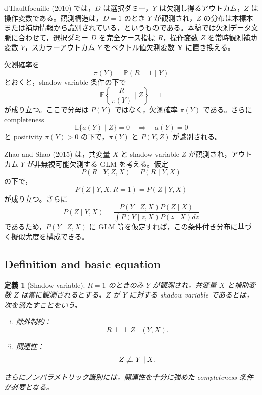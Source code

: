 \documentclass[10pt,a4paper]{article}
\newtheorem{definition}{定義}
\newcommand{\indep}{\mathrel{\perp\!\!\!\perp}}
\newcommand{\E}{\mathbb{E}}
\newcommand{\Prb}{\mathbb{P}}
\newcommand{\1}{\mathbf{1}}
\newcommand{\Y}{\bm{Y}}
\begin{document}
d'Haultfoeuille (2010) では，$D$ は選択ダミー，$Y$ は欠測し得るアウトカム，$Z$ は操作変数である。観測構造は，$D=1$ のとき $Y$ が観測され，$Z$ の分布は本標本または補助情報から識別されている，というものである。本稿では欠測データ文脈に合わせて，選択ダミー $D$ を完全ケース指標 $R$，操作変数 $Z$ を常時観測補助変数 $V$，スカラーアウトカム $Y$ をベクトル値欠測変数 $\Y$ に置き換える。

欠測確率を
\begin{equation}
  \pi(Y)=\Prb(R=1\mid Y)
\end{equation}
とおくと，shadow variable 条件の下で
\begin{equation}
  \E\left\{\frac{R}{\pi(Y)}\mid Z\right\}=1
  \label{eq:dh-correct-moment}
\end{equation}
が成り立つ。ここで分母は $P(Y)$ ではなく，欠測確率 $\pi(Y)$ である。さらに completeness
\begin{equation}
  \E\{a(Y)\mid Z\}=0 \quad\Rightarrow\quad a(Y)=0
  \label{eq:dh-completeness}
\end{equation}
と positivity $\pi(Y)>0$ の下で，$\pi(Y)$ と $P(Y,Z)$ が識別される。

Zhao and Shao (2015) は，共変量 $X$ と shadow variable $Z$ が観測され，アウトカム $Y$ が非無視可能欠測する GLM を考える。仮定
\begin{equation}
  P(R\mid Y,Z,X)=P(R\mid Y,X)
\end{equation}
の下で，
\begin{equation}
P(Z\mid Y,X,R=1)=P(Z\mid Y,X)
\end{equation}
が成り立つ。さらに
\begin{equation}
P(Z\mid Y,X)=
\frac{P(Y\mid Z,X)P(Z\mid X)}{\int P(Y\mid z,X)P(z\mid X)dz}
\end{equation}
であるため，$P(Y\mid Z,X)$ に GLM 等を仮定すれば，この条件付き分布に基づく擬似尤度を構成できる。

\subsection{Definition and basic equation}

\begin{definition}[Shadow variable]
\label{def:shadow-variable}
$R=1$ のときのみ $Y$ が観測され，共変量 $X$ と補助変数 $Z$ は常に観測されるとする。$Z$ が $Y$ に対する shadow variable であるとは，次を満たすことをいう。
\begin{enumerate}[(i)]
  \item 除外制約：
  \begin{equation}
    R\indep Z\mid (Y,X).
    \label{eq:shadow-exclusion}
  \end{equation}
  \item 関連性：
  \begin{equation}
    Z\not\indep Y\mid X.
    \label{eq:shadow-relevance}
  \end{equation}
\end{enumerate}
さらにノンパラメトリック識別には，関連性を十分に強めた completeness 条件が必要となる。
\end{definition}
\end{document}
